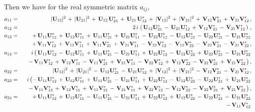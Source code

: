 \documentclass[
 reprint,
 amsmath,amssymb,
 aps,
prd,
]{revtex4-1}
\begin{document}
\begin{widetext}
Then we have for the real symmetric matrix $a_{ij}$,
\begin{eqnarray}
a_{11} &=& 
 \,|\UM_{12}|^{2}\,
+\,|\UM_{21}|^{2}\,
+\,\UM_{12}\,\UMC_{21}\, 
+\,\UM_{21}\,\UMC_{12}\,
+\,|\VM_{12}|^{2}\,
+\,|\VM_{21}|^{2}\,
+\,\VM_{12}\VMC_{21}\, 
+\,\VM_{21}\VMC_{12}\, 
, \\
%
a_{12} &=& 2\, i\, \left (
 \,\UM_{12}\UMC_{21} \,
-\,\UM_{21}\UMC_{12} \,
+\,\VM_{12}\VMC_{21} \,
-\,\VM_{21}\VMC_{12} \, 
\right ) \, ,
\\
%
a_{13} &=& 
+\,\UM_{11}\UMC_{12}\,
+\,\UM_{12}\UMC_{11}\,
+\,\UM_{11}\UMC_{21}\,
+\,\UM_{21}\UMC_{11}\,
-\,\UM_{22}\UMC_{12}\,
-\,\UM_{12}\UMC_{22}\,
-\,\UM_{22}\UMC_{21}\,
-\,\UM_{21}\UMC_{22}\,
\nonumber \\
&& 
+\,\VM_{11}\VMC_{12}\,
+\,\VM_{12}\VMC_{11}\,
+\,\VM_{11}\VMC_{21}\,
+\,\VM_{21}\VMC_{11}\,
-\,\VM_{22}\VMC_{12}\,
-\,\VM_{12}\VMC_{22}\,
-\,\VM_{22}\VMC_{21}\,
-\,\VM_{21}\VMC_{22}\, 
, \\
%
a_{14} &=& i\, \bigl (
 \,\UM_{11}\UMC_{12}\,
-\,\UM_{12}\UMC_{11}\,
+\,\UM_{11}\UMC_{21}\,
-\,\UM_{21}\UMC_{11}\,
+\,\UM_{22}\UMC_{12}\,
-\,\UM_{12}\UMC_{22}\,
+\,\UM_{22}\UMC_{21}\,
-\,\UM_{21}\UMC_{22}\,
 \nonumber \\
&&\; 
-\,\VM_{11}\VMC_{12}\,
+\,\VM_{12}\VMC_{11}\,
-\,\VM_{11}\VMC_{21}\,
+\,\VM_{21}\VMC_{11}\,
-\,\VM_{22}\VMC_{12}\,
+\,\VM_{12}\VMC_{22}\,
-\,\VM_{22}\VMC_{21}\,
+\,\VM_{21}\VMC_{22}\,
\bigr ) \, ,
 \\
%
a_{22} &=& 
 \,|\UM_{12}|^{2}\,
+\,|\UM_{21}|^{2}\,
-\,\UM_{12}\UMC_{21}\,
-\,\UM_{21}\UMC_{12}\,
+\,|\VM_{12}|^{2}\,
+\,|\VM_{21}|^{2}\,
-\,\VM_{12}\VMC_{21}\,
-\,\VM_{21}\VMC_{12}\, 
, \\
%
a_{23} &=& i\, \bigl (
-\,\UM_{11}\UMC_{12}\,
+\,\UM_{12}\UMC_{11}\,
+\,\UM_{11}\UMC_{21}\,
-\,\UM_{21}\UMC_{11}\, 
+\,\UM_{22}\UMC_{12}\,
-\,\UM_{12}\UMC_{22}\,
-\,\UM_{22}\UMC_{21}\,
+\,\UM_{21}\UMC_{22}\,
\nonumber \\
&&\quad
-\,\VM_{11}\VMC_{12}\,
+\,\VM_{12}\VMC_{11}\,
+\,\VM_{11}\VMC_{21}\, 
-\,\VM_{21}\VMC_{11}\,
+\,\VM_{22}\VMC_{12}\,
-\,\VM_{12}\VMC_{22}\,
-\,\VM_{22}\VMC_{21}\,
+\,\VM_{21}\VMC_{22}\,
\bigr ) \, ,
\\
%
a_{24} &=& 
+\,\UM_{11}\UMC_{12}\,
+\,\UM_{12}\UMC_{11}\,
-\,\UM_{11}\UMC_{21}\,
-\,\UM_{21}\UMC_{11}\,
+\,\UM_{22}\UMC_{12}\,
+\,\UM_{12}\UMC_{22}\,
-\,\UM_{22}\UMC_{21}\,
-\,\UM_{21}\UMC_{22}\,
 \nonumber \\
&& 
-\,\VM_{11}\VMC_{12}\,

\end{eqnarray}
\end{widetext}
\end{document}
